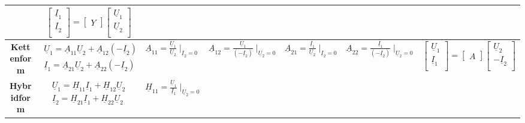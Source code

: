 \begin{table}
\begin{tabular}{| c | c | c | c | c | c | c |}
			&$ \begin{bmatrix}
					\underline{I}_{1}\\
					\underline{I}_{2}\\
				\end{bmatrix}
				=
				\begin{bmatrix}
					Y
				\end{bmatrix}
				\begin{bmatrix}
					\underline{U}_{1}\\
					\underline{U}_{2}\\
				\end{bmatrix}$\\
		\hline
			\textbf{Kettenform}
			& $ \begin{matrix}
					\underline{U}_{1}=\underline{A}_{11}\underline{U}_{2}+\underline{A}_{12}(-\underline{I}_{2})\\
					\underline{I}_{1}=\underline{A}_{21}\underline{U}_{2}+\underline{A}_{22}(-\underline{I}_{2})\\
					\end{matrix}$
			& $\underline{A}_{11}=\frac{\underline{U}_{1}}{\underline{U}_{2}} \mid_{\underline{I}_2=0}$
			& $\underline{A}_{12}=\frac{\underline{U}_{1}}{(-\underline{I}_{2})}
			\mid_{\underline{U}_2=0}$ & $\underline{A}_{21}=\frac{\underline{I}_{1}}{\underline{U}_{2}} \mid_{\underline{I}_2=0}$
			& $\underline{A}_{22}=\frac{\underline{I}_{1}}{(-\underline{I}_{2})}
			\mid_{\underline{U}_2=0}$ & $ \begin{bmatrix}
					\underline{U}_{1}\\
					\underline{I}_{1}\\
				\end{bmatrix}
				=
				\begin{bmatrix}
					A
				\end{bmatrix}
				\begin{bmatrix}
					\underline{U}_{2}\\
					-\underline{I}_{2}\\
				\end{bmatrix}$\\
		\hline
			\textbf{Hybridform}
			& $ \begin{matrix}
					\underline{U}_{1}=\underline{H}_{11}\underline{I}_{1}+\underline{H}_{12}\underline{U}_{2}\\
					\underline{I}_{2}=\underline{H}_{21}\underline{I}_{1}+\underline{H}_{22}\underline{U}_{2}\\
				\end{matrix}$
			& $\underline{H}_{11}=\frac{\underline{U}_{1}}{\underline{I}_{1}} \mid_{\underline{U}_2=0}$

\end{tabular}
\end{table}
